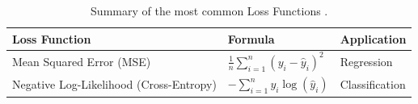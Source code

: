 \begin{table}[htb!]
\centering
\footnotesize
\caption{Summary of the most common Loss Functions \cite{goodfellow_deep_2016}.}
\label{Tables:LossFunctions}
\begin{tabularx}{\textwidth}{@{}lXl@{}}
\toprule
\textbf{Loss Function} & \textbf{Formula} & \textbf{Application} \\
\midrule
Mean Squared Error (MSE) & \( \frac{1}{n} \sum_{i=1}^n (y_i - \hat{y}_i)^2 \) & Regression \\
\addlinespace
Negative Log-Likelihood (Cross-Entropy) & \( -\sum_{i=1}^n y_i \log(\hat{y}_i) \) & Classification \\
\bottomrule
\end{tabularx}
\end{table}